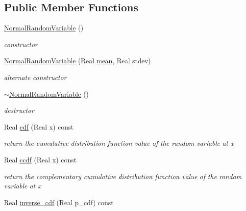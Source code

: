 \subsection*{Public Member Functions}
\begin{DoxyCompactItemize}
\item 
\hyperlink{classPecos_1_1NormalRandomVariable_a38f48d02679ba9bf6b7926e4618aba1e}{Normal\+Random\+Variable} ()\label{classPecos_1_1NormalRandomVariable_a38f48d02679ba9bf6b7926e4618aba1e}

\begin{DoxyCompactList}\small\item\em constructor \end{DoxyCompactList}\item 
\hyperlink{classPecos_1_1NormalRandomVariable_ad74b95737afea6cd530778462abc6fd5}{Normal\+Random\+Variable} (Real \hyperlink{classPecos_1_1NormalRandomVariable_a962ffe5a3593be370d5c883365c060f4}{mean}, Real stdev)\label{classPecos_1_1NormalRandomVariable_ad74b95737afea6cd530778462abc6fd5}

\begin{DoxyCompactList}\small\item\em alternate constructor \end{DoxyCompactList}\item 
\hyperlink{classPecos_1_1NormalRandomVariable_a297038edcbddebccbc6ef8b4bed843a4}{$\sim$\+Normal\+Random\+Variable} ()\label{classPecos_1_1NormalRandomVariable_a297038edcbddebccbc6ef8b4bed843a4}

\begin{DoxyCompactList}\small\item\em destructor \end{DoxyCompactList}\item 
Real \hyperlink{classPecos_1_1NormalRandomVariable_addd564e7f4f314e12d38df74d845f0d8}{cdf} (Real x) const \label{classPecos_1_1NormalRandomVariable_addd564e7f4f314e12d38df74d845f0d8}

\begin{DoxyCompactList}\small\item\em return the cumulative distribution function value of the random variable at x \end{DoxyCompactList}\item 
Real \hyperlink{classPecos_1_1NormalRandomVariable_a23c3b599e7e4788a9a5e9e93c3dbaf4d}{ccdf} (Real x) const \label{classPecos_1_1NormalRandomVariable_a23c3b599e7e4788a9a5e9e93c3dbaf4d}

\begin{DoxyCompactList}\small\item\em return the complementary cumulative distribution function value of the random variable at x \end{DoxyCompactList}\item 
Real \hyperlink{classPecos_1_1NormalRandomVariable_a918a1aac05ca349ea5313eebcba46c3e}{inverse\+\_\+cdf} (Real p\+\_\+cdf) const \label{classPecos_1_1NormalRandomVariable_a918a1aac05ca349ea5313eebcba46c3e}


\end{DoxyCompactItemize}
